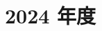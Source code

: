 \documentclass[../../hsm_tok_a.tex]{subfiles}
\begin{document}
    \section{2024 年度}

    

    \clearpage

    
\end{document}
